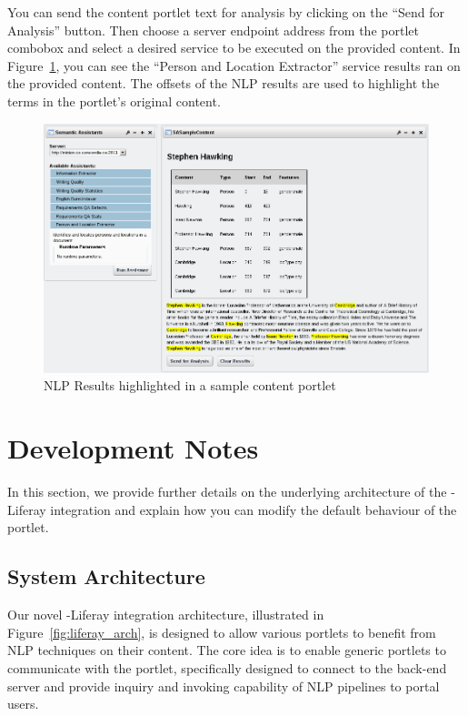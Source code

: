 You can send the content portlet text for analysis by clicking on the ``Send for Analysis'' button. Then choose a server endpoint address from the \sa portlet combobox and select a desired service to be executed on the provided content. In Figure~\ref{fig:liferay_results_portlet}, you can see the ``Person and Location Extractor'' service results ran on the provided content. The offsets of the NLP results are used to highlight the terms in the portlet's original content.

\begin{figure}
\centering
\includegraphics[scale=0.6]{pictures/liferay_results_portlet.png}
\caption{NLP Results highlighted in a sample content portlet}
\label{fig:liferay_results_portlet}
\end{figure}

\section{Development Notes}
In this section, we provide further details on the underlying architecture of the \sa-Liferay integration and explain how you can modify the default behaviour of the \sa portlet.

\subsection{System Architecture}
Our novel \sa-Liferay integration architecture, illustrated in Figure~\ref{fig:liferay_arch}, is designed to allow various portlets to benefit from NLP techniques on their content. The core idea is to enable generic portlets to communicate with the \sa portlet, specifically designed to connect to the back-end \sa server and provide inquiry and invoking capability of NLP pipelines to portal users. 

